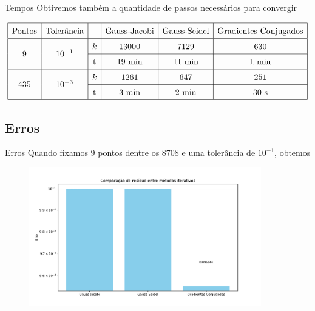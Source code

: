 \documentclass[11pt]{beamer}
\begin{document}
\begin{frame}{Tempos}
    Obtivemos também a quantidade de passos necessários para convergir

    \footnotesize
    \[\renewcommand{\arraystretch}{1.5}
    \begin{array}{|c|c|c|c|c|c|}
        \hline
        \text{Pontos} & \text{Tolerância} & & \text{Gauss-Jacobi} & \text{Gauss-Seidel} & \text{Gradientes Conjugados}\\
        \hline
        \smash{\raisebox{-.3cm}{9}} & \smash{\raisebox{-.3cm}{$10^{-1}$}} & k & 13000 & 7129 & 630\\
        \cline{3-6}
        & & \text{t} & 19\text{ min} & 11\text{ min} & 1\text{ min}\\
        \hline
        \smash{\raisebox{-.3cm}{435}} & \smash{\raisebox{-.3cm}{$10^{-3}$}} & k & 1261 & 647 & 251\\
        \cline{3-6}
        & & \text{t} & 3\text{ min} & 2\text{ min} & 30\text{ s}\\
        \hline
    \end{array}\]
\end{frame}

\subsection{Erros}

\begin{frame}{Erros}
    Quando fixamos 9 pontos dentre os 8708 e uma tolerância de $10^{-1}$, obtemos
    \begin{figure}[htb]
        \label{fig:erros_iterativos_9pontos}
        \centering
        \includegraphics[width=0.9\textwidth]{../figs/fig9.pdf}
    \end{figure}
\end{frame}
\end{document}
